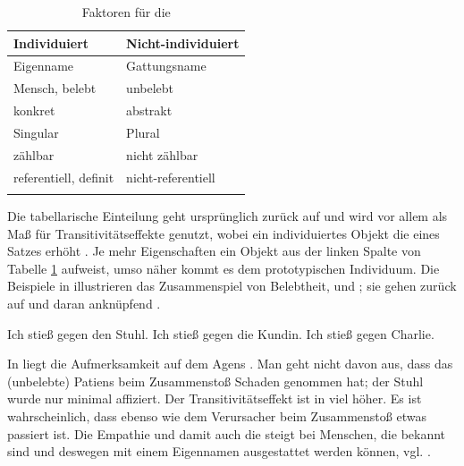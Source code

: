 \begin{table}[h]
\begin{tabular}{ll}
\lsptoprule
Individuiert & Nicht-individuiert\\ \midrule
Eigenname                    & Gattungsname         \\
Mensch, belebt               & unbelebt             \\
konkret                      & abstrakt             \\
Singular                     & Plural               \\
zählbar                      & nicht zählbar        \\
referentiell, definit        & nicht-referentiell   \\ \lspbottomrule
\end{tabular}
\caption{Faktoren für die   \parencite[253]{Hopper1980}\label{tab:indi}}
\end{table}

Die tabellarische Einteilung geht ursprünglich zurück auf \textcite{Timberlake1975,Timberlake1977} und wird vor allem als Maß für Transitivitätseffekte  genutzt, wobei ein individuiertes  Objekt  die  eines Satzes erhöht \parencite[s. auch][]{Gillmann2016}. Je mehr Eigenschaften ein Objekt aus der linken Spalte von Tabelle \ref{tab:indi} aufweist, umso näher kommt es dem prototypischen Individuum. 
Die Beispiele in  illustrieren das Zusammenspiel von Belebtheit,   und ; sie gehen zurück auf \textcite[253]{Hopper1980} und daran anknüpfend \textcite[344]{Szczepaniak2011}.

\begin{exe}
	\ex \label{ex:stossen}
	\begin{xlist}
		\ex \label{ex:stuhl} Ich stieß gegen den Stuhl.
 		\ex \label{ex:kundin} Ich stieß gegen die Kundin.
		\ex \label{ex:chalie} Ich stieß gegen Charlie.
	\end{xlist}
\end{exe}
\noindent
In  liegt die Aufmerksamkeit auf dem Agens  . Man geht nicht davon aus, dass das (unbelebte)  Patiens  beim  Zusammenstoß Schaden genommen hat; der Stuhl wurde nur minimal affiziert. Der Transitivitätseffekt  ist in  viel höher. Es ist wahrscheinlich, dass  ebenso wie dem Verursacher beim Zusammenstoß etwas passiert ist. Die Empathie und damit auch die   steigt bei Menschen, die bekannt sind und deswegen mit einem Eigennamen ausgestattet werden können, vgl. .

